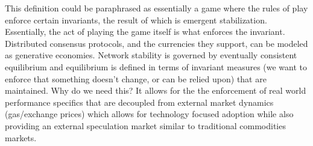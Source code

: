\documentclass{article}
\begin{document}
This definition could be paraphrased as essentially a game where the rules of play enforce certain invariants, the result of which is emergent stabilization. Essentially, the act of playing the game itself is what enforces the invariant. Distributed consensus protocols, and the currencies they support, can be modeled as generative economies. Network stability is governed by eventually consistent equilibrium and equilibrium is defined in terms of invariant measures (we want to enforce that something doesn't change, or can be relied upon) that are maintained. Why do we need this? It allows for the the enforcement of real world performance specifics that are decoupled from external market dynamics (gas/exchange prices) which allows for technology focused adoption while also providing an external speculation market similar to traditional commodities markets.



\end{document}
